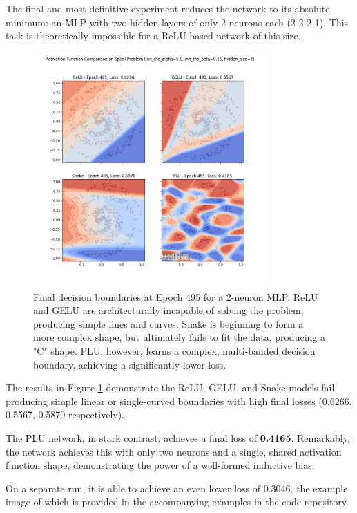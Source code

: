 \documentclass[11pt, letterpaper]{article}
\begin{document}
The final and most definitive experiment reduces the network to its absolute minimum: an MLP with two hidden layers of only 2 neurons each (2-2-2-1). This task is theoretically impossible for a ReLU-based network of this size.

\begin{figure}[H]
    \centering
    \includegraphics[width=0.8\textwidth]{Examples/spiral_activation_comparison_hidden_neurons_2_epoch_495.jpg}
    \caption{Final decision boundaries at Epoch 495 for a 2-neuron MLP. ReLU and GELU are architecturally incapable of solving the problem, producing simple lines and curves. Snake is beginning to form a more complex shape, but ultimately fails to fit the data, producing a "C" shape. PLU, however, learns a complex, multi-banded decision boundary, achieving a significantly lower loss.}
    \label{fig:spiral_2_neurons_final}
\end{figure}

The results in Figure \ref{fig:spiral_2_neurons_final} demonstrate the ReLU, GELU, and Snake models fail, producing simple linear or single-curved boundaries with high final losses (0.6266, 0.5567, 0.5870 respectively).

The PLU network, in stark contrast, achieves a final loss of \textbf{0.4165}. Remarkably, the network achieves this with only two neurons and a single, shared activation function shape, demonstrating the power of a well-formed inductive bias.

On a separate run, it is able to achieve an even lower loss of 0.3046, the example image of which is provided in the accompanying examples in the code repository.
\end{document}
